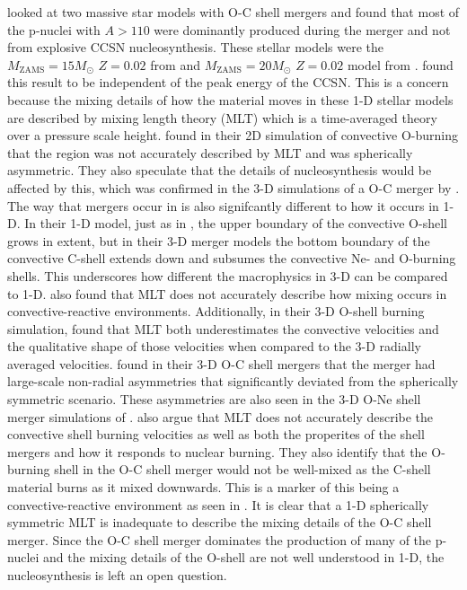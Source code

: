 \cite{robertiGprocessNucleosynthesisCorecollapse2023} looked at two massive star models with O-C shell mergers and found that most of the p-nuclei with $A > 110$ were dominantly produced during the merger and not from explosive CCSN nucleosynthesis. 
These stellar models were the $M_{\mathrm{ZAMS}}=15 M_\odot$ $Z=0.02$ from \cite{ritterNuGridStellarData2018} and $M_{\mathrm{ZAMS}}=20 M_\odot$ $Z=0.02$ model from \cite{rauscherNucleosynthesisMassiveStars2002}.
\cite{robertiGprocessNucleosynthesisCorecollapse2024b} found this result to be independent of the peak energy of the CCSN. 
This is a concern because the mixing details of how the material moves in these 1-D stellar models are described by mixing length theory (MLT) which is a time-averaged theory over a pressure scale height. 
\cite{bazanConvectionNucleosynthesisCore1994} found in their 2D simulation of convective O-burning that the region was not accurately described by MLT and was spherically asymmetric. 
They also speculate that the details of nucleosynthesis would be affected by this, which was confirmed in the 3-D simulations of a O-C merger by \cite{rizzutiShellMergersLate2024a}.
The way that mergers occur in \cite{rizzutiShellMergersLate2024a} is also signifcantly different to how it occurs in 1-D.
In their 1-D model, just as in \cite{ritterNuGridStellarData2018}, the upper boundary of the convective O-shell grows in extent, but in their 3-D merger models the bottom boundary of the convective C-shell extends down and subsumes the convective Ne- and O-burning shells.
This underscores how different the macrophysics in 3-D can be compared to 1-D.
\cite{herwigCONVECTIVEREACTIVEPROTON2011} also found that MLT does not accurately describe how mixing occurs in convective-reactive environments. 
Additionally, in their 3-D O-shell burning simulation, \cite{jonesIdealizedHydrodynamicSimulations2017} found that MLT both underestimates the convective velocities and the qualitative shape of those velocities when compared to the 3-D radially averaged velocities. 
\cite{andrassy3DHydrodynamicSimulations2020} found in their 3-D O-C shell mergers that the merger had large-scale non-radial asymmetries that significantly deviated from the spherically symmetric scenario. 
These asymmetries are also seen in the 3-D O-Ne shell merger simulations of \cite{yadavLargescaleMixingViolent2020a}.
\cite{collinsPropertiesConvectiveOxygen2018} also argue that MLT does not accurately describe the convective shell burning velocities as well as both the properites of the shell mergers and how it responds to nuclear burning.
They also identify that the O-burning shell in the O-C shell merger would not be well-mixed as the C-shell material burns as it mixed downwards.
This is a marker of this being a convective-reactive environment as seen in \cite{ritterConvectivereactiveNucleosynthesisSc2018}.
It is clear that a 1-D spherically symmetric MLT is inadequate to describe the mixing details of the O-C shell merger.
Since the O-C shell merger dominates the production of many of the p-nuclei and the mixing details of the O-shell are not well understood in 1-D, the nucleosynthesis is left an open question.

